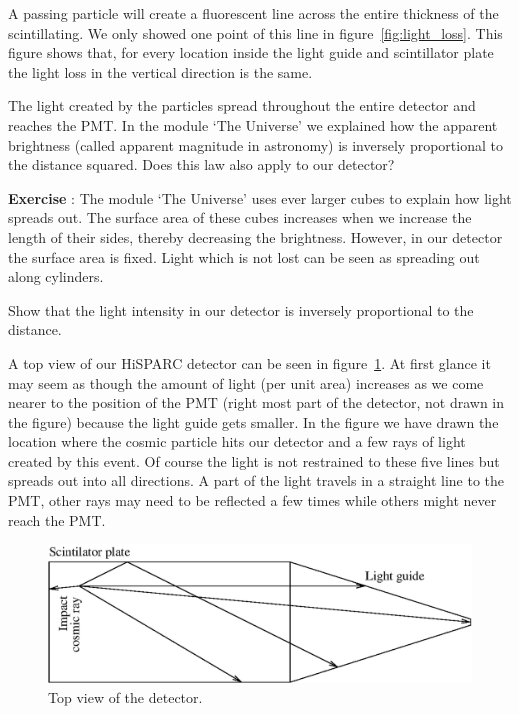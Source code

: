 \documentclass[12pt,a4paper]{article}
\numberwithin{equation}{section}
\numberwithin{figure}{section}
\newcounter{Exercise}
\numberwithin{table}{section}
\begin{document}
A passing particle will create a fluorescent line across the entire thickness of the scintillating. We only showed one point of this line in figure~\ref{fig:light_loss}. This figure shows that, for every location inside the light guide and scintillator plate the light loss in the vertical direction is the same.

The light created by the particles spread throughout the entire detector and reaches the PMT. In the module `The Universe' we explained how the apparent brightness (called apparent magnitude in astronomy) is inversely proportional to the distance squared. Does this law also apply to our detector?

\begin{shaded}
\textbf{Exercise \theExercise {}} : The module `The Universe' uses ever larger cubes to explain how light spreads out. The surface area of these cubes increases when we increase the length of their sides, thereby decreasing the brightness. However, in our detector the surface area is fixed. Light which is not lost can be seen as spreading out along cylinders. 

Show that the light intensity in our detector is inversely proportional to the distance. \end{shaded}

A top view of our HiSPARC detector can be seen in figure~\ref{fig:top_view}. At first glance it may seem as though the amount of light (per unit area) increases as we come nearer to the position of the PMT (right most part of the detector, not drawn in the figure) because the light guide gets smaller. In the figure we have drawn the location where the cosmic particle hits our detector and a few rays of light created by this event. Of course the light is not restrained to these five lines but spreads out into all directions. A part of the light travels in a straight line to the PMT, other rays may need to be reflected a few times while others might never reach the PMT.

\begin{figure}\begin{center}
\includegraphics[scale=1]{top_view.eps}
\caption{Top view of the detector.}\label{fig:top_view}
\end{center}\end{figure}
\end{document}
